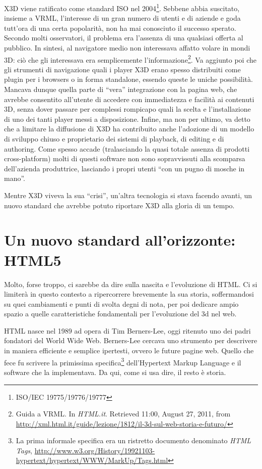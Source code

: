 X3D viene ratificato come standard ISO nel 2004\footnote{ISO/IEC 19775/19776/19777}. Sebbene abbia suscitato, insieme a VRML, l'interesse di un gran numero di utenti e di aziende e goda tutt'ora di una certa popolarità, non ha mai conosciuto il successo sperato. Secondo molti osservatori, il problema era l'assenza di una qualsiasi offerta al pubblico. In sintesi, al navigatore medio non interessava affatto volare in mondi 3D: ciò che gli interessava era semplicemente l'informazione\footnote{Guida a VRML. In \textit{HTML.it}. Retrieved 11:00, August 27, 2011, from \url{http://xml.html.it/guide/lezione/1812/il-3d-sul-web-storia-e-futuro/}}. Va aggiunto poi che gli strumenti di navigazione quali i player X3D erano spesso distribuiti come plugin per i browsers o in forma standalone, essendo queste le uniche possibilità. Mancava dunque quella parte di “vera” integrazione con la pagina web, che avrebbe consentito all'utente di accedere con immediatezza e facilità ai contenuti 3D, senza dover passare per complessi rompicapo quali la scelta e l'installazione di uno dei tanti player messi a disposizione. Infine, ma non per ultimo, va detto che a limitare la diffusione di X3D ha contribuito anche l'adozione di un modello di sviluppo chiuso e proprietario dei sistemi di playback, di editing e di authoring. Come spesso accade (tralasciando la quasi totale assenza di prodotti cross-platform) molti di questi software non sono sopravvissuti alla scomparsa dell'azienda produttrice, lasciando i propri utenti “con un pugno di mosche in mano”.

Mentre X3D viveva la sua “crisi”, un'altra tecnologia si stava facendo avanti, un nuovo standard che avrebbe potuto riportare X3D alla gloria di un tempo.

\clearpage
\section{Un nuovo standard all'orizzonte: HTML5}
Molto, forse troppo, ci sarebbe da dire sulla nascita e l'evoluzione di HTML. Ci si limiterà in questo contesto a ripercorrere brevemente la sua storia, soffermandosi su quei cambiamenti e punti di svolta degni di nota, per poi dedicare ampio spazio a quelle caratteristiche fondamentali per l'evoluzione del 3d nel web.

HTML nasce nel 1989 ad opera di Tim Berners-Lee, oggi ritenuto uno dei padri fondatori del World Wide Web. Berners-Lee cercava uno strumento per descrivere in maniera efficiente e semplice ipertesti, ovvero le future pagine web. Quello che fece fu scrivere la primissima specifica\footnote{La prima informale specifica era un ristretto documento denominato \textit{HTML Tags}, \url{http://www.w3.org/History/19921103-hypertext/hypertext/WWW/MarkUp/Tags.html}} dell'Hypertext Markup Language e il software che la implementava. Da qui, come si usa dire, il resto è storia.

